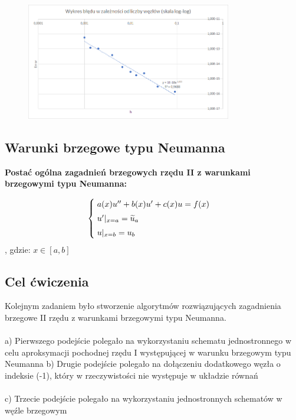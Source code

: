 \begin{samepage}
    
    \begin{figure}[!ht]
        \begin{center}
            \includegraphics[width=0.8\textwidth]{Lab4/charts/zad3/error.png}
        \end{center}
    \end{figure}
    \FloatBarrier
\end{samepage}   
    
    

\subsection{Warunki brzegowe typu Neumanna}
\textbf{Postać ogólna zagadnień brzegowych rzędu II z warunkami brzegowymi typu Neumanna:}

\[
\begin{cases}
\vspace{0.1cm} 
\hspace{0,1cm} a(x) u'' + b(x)u' + c(x)u =f(x) \\
\vspace{0.1cm}
\hspace{0,1cm}u'|_{x=a} = \widetilde{u}_{a} \\
\hspace{0,1cm}u|_{x=b} = u_{b}
\end{cases}
\]
, gdzie:
$x\in[a,b]$
\\

\subsection{Cel ćwiczenia}
Kolejnym zadaniem było stworzenie algorytmów rozwiązujących zagadnienia brzegowe II rzędu z warunkami brzegowymi typu Neumanna.
\\\\
a) Pierwszego podejście polegało na wykorzystaniu schematu jednostronnego w celu aproksymacji pochodnej rzędu I występującej w warunku brzegowym typu Neumanna
\newpage
b) Drugie podejście polegało na dołączeniu dodatkowego węzła o indeksie (-1), który w rzeczywistości nie występuje w układzie równań
\\\\
c) Trzecie podejście polegało na wykorzystaniu jednostronnych schematów w węźle brzegowym


